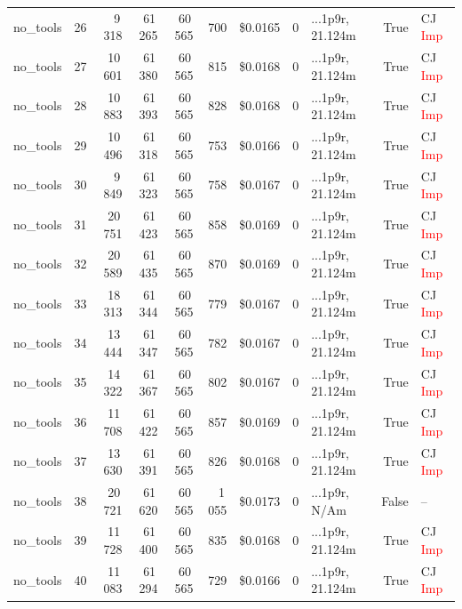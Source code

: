 \documentclass[a4paper,11pt]{article}
\begin{document}
\begin{table}[H]
{\begin{tabular}{l r r r r r r r l r l}
no\_tools & 26 & 9\,318 & 61\,265 & 60\,565 & 700 & \$0.0165 & 0 & ...1p9r, 21.124m & True & CJ \textcolor{red}{Imp} \\
no\_tools & 27 & 10\,601 & 61\,380 & 60\,565 & 815 & \$0.0168 & 0 & ...1p9r, 21.124m & True & CJ \textcolor{red}{Imp} \\
no\_tools & 28 & 10\,883 & 61\,393 & 60\,565 & 828 & \$0.0168 & 0 & ...1p9r, 21.124m & True & CJ \textcolor{red}{Imp} \\
no\_tools & 29 & 10\,496 & 61\,318 & 60\,565 & 753 & \$0.0166 & 0 & ...1p9r, 21.124m & True & CJ \textcolor{red}{Imp} \\
no\_tools & 30 & 9\,849 & 61\,323 & 60\,565 & 758 & \$0.0167 & 0 & ...1p9r, 21.124m & True & CJ \textcolor{red}{Imp} \\
no\_tools & 31 & 20\,751 & 61\,423 & 60\,565 & 858 & \$0.0169 & 0 & ...1p9r, 21.124m & True & CJ \textcolor{red}{Imp} \\
no\_tools & 32 & 20\,589 & 61\,435 & 60\,565 & 870 & \$0.0169 & 0 & ...1p9r, 21.124m & True & CJ \textcolor{red}{Imp} \\
no\_tools & 33 & 18\,313 & 61\,344 & 60\,565 & 779 & \$0.0167 & 0 & ...1p9r, 21.124m & True & CJ \textcolor{red}{Imp} \\
no\_tools & 34 & 13\,444 & 61\,347 & 60\,565 & 782 & \$0.0167 & 0 & ...1p9r, 21.124m & True & CJ \textcolor{red}{Imp} \\
no\_tools & 35 & 14\,322 & 61\,367 & 60\,565 & 802 & \$0.0167 & 0 & ...1p9r, 21.124m & True & CJ \textcolor{red}{Imp} \\
no\_tools & 36 & 11\,708 & 61\,422 & 60\,565 & 857 & \$0.0169 & 0 & ...1p9r, 21.124m & True & CJ \textcolor{red}{Imp} \\
no\_tools & 37 & 13\,630 & 61\,391 & 60\,565 & 826 & \$0.0168 & 0 & ...1p9r, 21.124m & True & CJ \textcolor{red}{Imp} \\
no\_tools & 38 & 20\,721 & 61\,620 & 60\,565 & 1\,055 & \$0.0173 & 0 & ...1p9r, N/Am & False & -- \\
no\_tools & 39 & 11\,728 & 61\,400 & 60\,565 & 835 & \$0.0168 & 0 & ...1p9r, 21.124m & True & CJ \textcolor{red}{Imp} \\
no\_tools & 40 & 11\,083 & 61\,294 & 60\,565 & 729 & \$0.0166 & 0 & ...1p9r, 21.124m & True & CJ \textcolor{red}{Imp} \\
\bottomrule
\end{tabular}}
\end{table}
\end{document}
